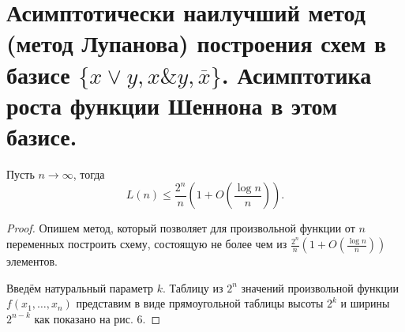 \section{Асимптотически наилучший метод (метод Лупанова) построения схем в базисе $\{x\vee y, x \& y, \overline{x}\}$. Асимптотика роста функции Шеннона в этом базисе.}

\begin{theorem}[О. Б. Лупанов]
    Пусть $n\to \infty$, тогда
    \[
        L(n)\leqslant \frac{2^n}{n}\left(1+O\left(\frac{\log n}{n}\right)\right).
    \]
\end{theorem}

\begin{proof}
    Опишем метод, который позволяет для произвольной функции от $n$ переменных построить схему, состоящую не более чем из $\frac{2^n}{n} \left(1+O\left(\frac{\log n}{n}\right)\right)$ элементов.

    Введём натуральный параметр $k$. Таблицу из $2^n$ значений произвольной функции $f(x_1, \ldots, x_n)$ представим в виде прямоугольной таблицы высоты $2^k$ и ширины $2^{n-k}$ как показано на рис. 6.
    

\end{proof}
